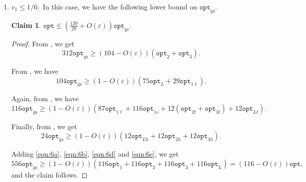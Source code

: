 \documentclass[10pt,a4paper]{amsart}
\renewcommand{\epsilon}{\varepsilon} %
\newtheorem{lemma}[theorem]{Lemma}
\newtheorem{claim}[theorem]{Claim}
\theoremstyle{definition}
\newcommand{\alg}{\mathtt{opt}_{\mathrm{gs}}}
\newcommand{\opt}{\mathtt{opt}}
\newcommand{\optonel}{\mathtt{opt}_{1\ell}}
\newcommand{\optones}{\mathtt{opt}_{1s}}
\newcommand{\opttwot}{\mathtt{opt}_{2t}}
\newcommand{\opttwoh}{\mathtt{opt}_{2h}}
\newcommand{\optthreet}{\mathtt{opt}_{3t}}
\newcommand{\optthreeh}{\mathtt{opt}_{3h}}
\newcommand{\optlt}{\mathtt{opt}_{Lt}}
\newcommand{\optlh}{\mathtt{opt}_{Lh}}
\begin{document}
\begin{enumerate}


    \item $v_1 \le 1/6:$ In this case, we have the following lower bound on $\alg$.


    \begin{claim}
    \label{cla:139by29}
        $\displaystyle\opt \le \left(\frac{139}{29}+O(\epsilon)\right)\alg$.
    \end{claim}
    \begin{proof}
        From , we get
        \begin{equation}
        \label{eqn:6a}
            312\alg \ge (104-O(\epsilon))(\opt_2 + \opt_3).
        \end{equation}

        From , we have
        \begin{equation}
        \label{eqn:6b}
            104\alg \ge (1-O(\epsilon))(75\opt_L + 29\optonel).
        \end{equation}

        Again, from , we have 
        \begin{equation}
        \label{eqn:6d}
            116\alg \ge (1-O(\epsilon))(87\optonel + 116\optones + 12(\opttwot + \optthreet)+ 12\optlt).
        \end{equation}

        Finally, from , we get
        \begin{equation}
        \label{eqn:6e}
            24\alg \ge (1-O(\epsilon))(12\optlh + 12\opttwoh + 12\optthreeh).
        \end{equation}

        Adding \eqref{eqn:6a}, \eqref{eqn:6b}, \eqref{eqn:6d} and \eqref{eqn:6e}, we get
        \[ 556\alg \ge (1-O(\epsilon))(116\opt_1 + 116\opt_2 + 116\opt_3 + 116\opt_L) = (116-O(\epsilon))\opt,\]
        and the claim follows.        
    \end{proof}


\end{enumerate}
\end{document}
